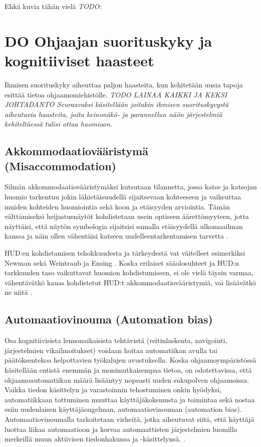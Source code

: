 \documentclass[utf8,bachelor,manualbib]{gradu3}
\begin{document}
Ehkä kuvia tähän vielä \citep{schnellym2004} \emph{TODO:}

\chapter{DO Ohjaajan suorituskyky ja kognitiiviset haasteet}

Ihmisen suorituskyky aiheuttaa paljon haasteita, kun kehitetään uusia tapoja 
esittää tietoa ohjaamomiehistölle. \emph{TODO LAINAA KAIKKI JA KEKSI JOHTADANTO Seuraavaksi käsitellään joitakin ihmisen suorituskyvystä aiheutuvia haasteita, joita keinonäkö- ja parannellun näön järjestelmiä kehiteltäessä tulisi ottaa huomioon.}

\section{Akkommodaatiovääristymä (Misaccommodation)}

Silmän akkommodaatiovääristymäksi kutsutaan tilannetta, jossa katse ja katsojan huomio tarkentuu jokin lähietäisuudellä sijaitsevaan kohteeseen ja vaikeuttaa muiden kohteiden huomiointia sekä koon ja etäisyyden arviointia. Tämän välttämiseksi heijastusnäytöt kohdistetaan usein optiseen äärettömyyteen, jotta näyttäisi, että näytön symbologia sijaitsisi samalla etäisyydellä ulkomaailman kanssa ja näin ollen vähentäisi katseen uudelleentarkentamisen tarvetta \citep{naish1964}.

HUD:en kohdistamisen tehokkuudesta ja tärkeydestä vat väitelleet esimerkiksi Newman \citeyearpar{newman1995} sekä Weintraub ja Ensing \citeyearpar{weintraubensing1992}. Koska erilaiset sääolosuhteet ja HUD:n tarkkuuden taso vaikuttavat huomion kohdistumiseen, ei ole vielä täysin varmaa, vähentävätkö kauas kohdistetut HUD:t akkommodaatiovääristymiä, vai lisäävätkö ne niitä \citep{crawfordneal2006}.

\section{Automaatiovinouma (Automation bias)}

Osa kognitiivisista lennonaikaisista tehtävistä (reitinlaskenta, navigointi, järjestelmien vikailmoitukset) voidaan hoitaa automatiikan avulla tai päätöksentekoa helpottavien työkalujen avustuksella. Koska ohjaamoympäristössä käsitellään entistä enemmän ja monimutkaisempaa tietoa, on odotettavissa, että ohjaamoautomatiikan määrä lisääntyy nopeasti uuden sukupolven ohjaamoissa. Vaikka tiedon käsittelyn ja varastoinnin tehostuminen onkin hyödyksi, automatiikkaan tottuminen muuttaa käyttäjäkokemusta ja toimintaa sekä nostaa esiin uudenlaisen käyttäjäongelman, automaatiovinouman (automation bias). Automaatiovinoumalla tarkoitetaan virheitä, jotka aiheutuvat siitä, että käyttäjä luottaa liikaa automaatioon ja korvaa automaattisten järjestelmien luomilla merkeillä muun aktiivisen tiedonhakunsa ja -käsittelynsä. \citep{mosierym1998}.
\end{document}

